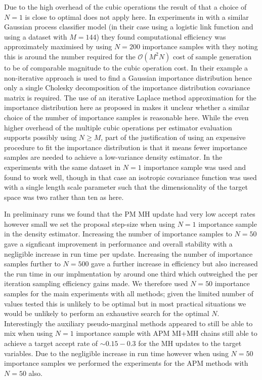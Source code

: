 Due to the high overhead of the cubic operations the result of \citep{sherlock2016pseudo} that a choice of $N=1$ is close to optimal does not apply here. In experiments in \citep{sherlock2016pseudo} with a similar Gaussian process classifier model (in their case using a logistic link function and using a dataset with $M=144$) they found computational efficiency was approximately maximised by using $N=200$ importance samples with they noting this is around the number required for the $\mathcal{O}(M^2 N)$ cost of sample generation to be of comparable magnitude to the cubic operation cost. In their example a non-iterative approach is used to find a Gaussian importance distribution hence only a single Cholesky decomposition of the importance distribution covariance matrix is required. The use of an iterative Laplace method approximation for the importance distribution here as proposed in \citep{filippone2014pseudo} makes it unclear whether a similar choice of the number of importance samples is reasonable here. While the even higher overhead of the multiple cubic operations per estimator evaluation supports possibly using $N \geq M$, part of the justification of using an expensive procedure to fit the importance distribution is that it means fewer importance samples are needed to achieve a low-variance density estimator. In the experiments with the same dataset in \citep{filippone2014pseudo} $N=1$ importance sample was used and found to work well, though in that case an isotropic covariance function was used with a single length scale parameter such that the dimensionality of the target space was two rather than ten as here.

In preliminary runs we found that the \ac{PM} \ac{MH} update had very low accept rates however small we set the proposal step-size when using $N=1$ importance sample in the density estimator. Increasing the number of importance samples to $N=50$ gave a signficant improvement in performance and overall stability with a negligible increase in run time per update. Increasing the number of importance samples further to $N=500$ gave a further increase in efficiency but also increased the run time in our implmentation by around one third which outweighed the per iteration sampling efficiency gains made. We therefore used $N=50$ importance samples for the main experiments with all methods; given the limited number of values tested this is unlikely to be optimal but in most practical situations we would be unlikely to perform an exhaustive search for the optimal $N$. Interestingly the auxiliary pseudo-marginal methods appeared to still be able to mix when using $N=1$ importance sample with \ac{APM} \ac{MI}+\ac{MH} chains still able to achieve a target accept rate of $\sim 0.15-0.3$ for the \ac{MH} updates to the target variables. Due to the negligible increase in run time however when using $N=50$ importance samples we performed the experiments for the \ac{APM} methods with $N=50$ also.


